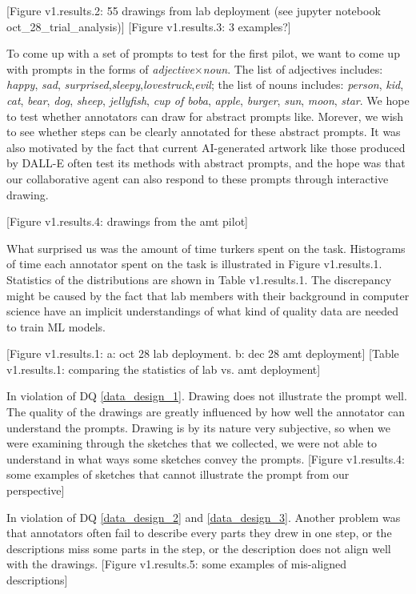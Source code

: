[Figure v1.results.2: 55 drawings from lab deployment (see jupyter notebook oct\_28\_trial\_analysis)]
[Figure v1.results.3: 3 examples?]

To come up with a set of prompts to test for the first pilot, we want to come up with prompts in the forms of \textit{adjective}$\times$\textit{noun}. The list of adjectives includes: \textit{happy}, \textit{sad}, \textit{surprised},\textit{sleepy},\textit{lovestruck},\textit{evil}; the list of nouns includes: \textit{person}, \textit{kid}, \textit{cat}, \textit{bear}, \textit{dog}, \textit{sheep}, \textit{jellyfish}, \textit{cup of boba}, \textit{apple}, \textit{burger}, \textit{sun}, \textit{moon}, \textit{star}. We hope to test whether annotators can draw for abstract prompts like. Morever, we wish to see whether steps can be clearly annotated for these abstract prompts. It was also motivated by the fact that current AI-generated artwork like those produced by DALL-E often test its methods with abstract prompts, and the hope was that our collaborative agent can also respond to these prompts through interactive drawing.   

[Figure v1.results.4: drawings from the amt pilot]

What surprised us was the amount of time turkers spent on the task. Histograms of time each annotator spent on the task is illustrated in Figure v1.results.1. Statistics of the distributions are shown in Table v1.results.1. The discrepancy might be caused by the fact that lab members with their background in computer science have an implicit understandings of what kind of quality data are needed to train ML models.   

[Figure v1.results.1: a: oct 28 lab deployment. b: dec 28 amt deployment]
[Table v1.results.1: comparing the statistics of lab vs. amt deployment]

In violation of DQ \ref{data_design_1}. Drawing does not illustrate the prompt well. The quality of the drawings are greatly influenced by how well the annotator can understand the prompts. Drawing is by its nature very subjective, so when we were examining through the sketches that we collected, we were not able to understand in what ways some sketches convey the prompts. 
[Figure v1.results.4: some examples of sketches that cannot illustrate the prompt from our perspective]

In violation of DQ \ref{data_design_2} and \ref{data_design_3}. Another problem was that annotators often fail to describe every parts they drew in one step, or the descriptions miss some parts in the step, or the description does not align well with the drawings.   
[Figure v1.results.5: some examples of mis-aligned descriptions]